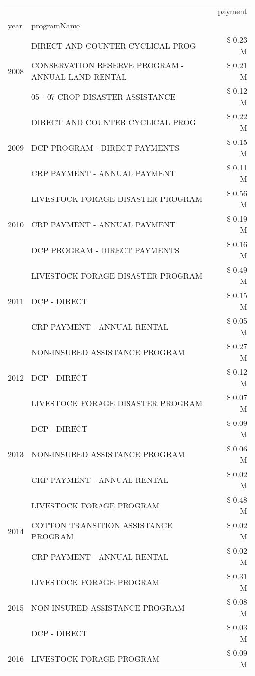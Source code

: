 \begin{tabular}{llr}
\toprule
 &  & payment \\
year & programName &  \\
\midrule
\multirow[t]{3}{*}{2008} & DIRECT AND COUNTER CYCLICAL PROG & \$ 0.23 M \\
 & CONSERVATION RESERVE PROGRAM - ANNUAL LAND RENTAL & \$ 0.21 M \\
 & 05 - 07 CROP DISASTER ASSISTANCE & \$ 0.12 M \\
\cline{1-3}
\multirow[t]{3}{*}{2009} & DIRECT AND COUNTER CYCLICAL PROG & \$ 0.22 M \\
 & DCP PROGRAM - DIRECT PAYMENTS & \$ 0.15 M \\
 & CRP PAYMENT - ANNUAL PAYMENT & \$ 0.11 M \\
\cline{1-3}
\multirow[t]{3}{*}{2010} & LIVESTOCK FORAGE DISASTER  PROGRAM & \$ 0.56 M \\
 & CRP PAYMENT - ANNUAL PAYMENT & \$ 0.19 M \\
 & DCP PROGRAM - DIRECT PAYMENTS & \$ 0.16 M \\
\cline{1-3}
\multirow[t]{3}{*}{2011} & LIVESTOCK FORAGE DISASTER PROGRAM & \$ 0.49 M \\
 & DCP - DIRECT & \$ 0.15 M \\
 & CRP PAYMENT - ANNUAL RENTAL & \$ 0.05 M \\
\cline{1-3}
\multirow[t]{3}{*}{2012} & NON-INSURED ASSISTANCE PROGRAM & \$ 0.27 M \\
 & DCP - DIRECT & \$ 0.12 M \\
 & LIVESTOCK FORAGE DISASTER PROGRAM & \$ 0.07 M \\
\cline{1-3}
\multirow[t]{3}{*}{2013} & DCP - DIRECT & \$ 0.09 M \\
 & NON-INSURED ASSISTANCE PROGRAM & \$ 0.06 M \\
 & CRP PAYMENT - ANNUAL RENTAL & \$ 0.02 M \\
\cline{1-3}
\multirow[t]{3}{*}{2014} & LIVESTOCK FORAGE PROGRAM & \$ 0.48 M \\
 & COTTON TRANSITION ASSISTANCE PROGRAM & \$ 0.02 M \\
 & CRP PAYMENT - ANNUAL RENTAL & \$ 0.02 M \\
\cline{1-3}
\multirow[t]{3}{*}{2015} & LIVESTOCK FORAGE PROGRAM & \$ 0.31 M \\
 & NON-INSURED ASSISTANCE PROGRAM & \$ 0.08 M \\
 & DCP - DIRECT & \$ 0.03 M \\
\cline{1-3}
\multirow[t]{3}{*}{2016} & LIVESTOCK FORAGE PROGRAM & \$ 0.09 M \\

\end{tabular}
